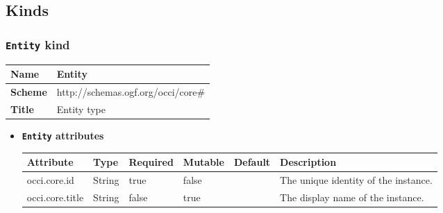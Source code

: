\subsection{Kinds}
\subsubsection{\texttt{Entity} kind}
\begin{center}
\begin{tabular}{|l|l|}
  \hline
  \textbf{Name} & Entity \\
  \hline  
  \textbf{Scheme} & http://schemas.ogf.org/occi/core\# \\
  \hline
  \textbf{Title} & Entity type \\
  \hline
\end{tabular}
\end{center}
\begin{itemize}
\item \textbf{\texttt{Entity} attributes}

\begin{tabularx}{\textwidth}{|l|l|p{1.4cm}|p{1.3cm}|l|X|}
  \hline
  \textbf{Attribute} & \textbf{Type} & \textbf{Required} & \textbf{Mutable} & \textbf{Default} & \textbf{Description} \\
  \hline  
  occi.core.id & String & true & false &  & The unique identity of the instance. \\
  \hline
  occi.core.title & String & false & true &  & The display name of the instance. \\
  \hline
\end{tabularx}
\end{itemize}



